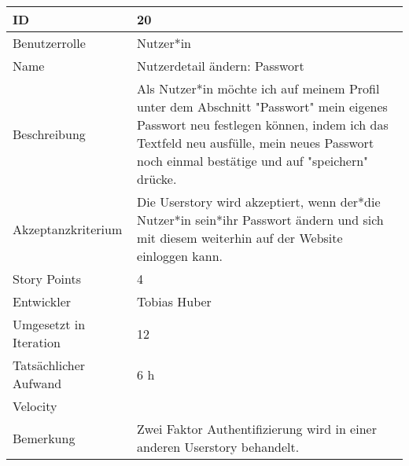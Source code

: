 \begin{tabularx}{\textwidth}{|p{}|X|}
	\hline
	ID & 20\\
	\hline
	Benutzerrolle & Nutzer*in\\
	\hline
	Name & Nutzerdetail ändern: Passwort\\
	\hline
	Beschreibung & Als Nutzer*in möchte ich auf meinem Profil unter dem Abschnitt "Passwort" mein eigenes Passwort neu festlegen können, indem ich das Textfeld neu ausfülle, mein neues Passwort noch einmal bestätige und auf "speichern" drücke.\\
	\hline
	Akzeptanzkriterium & Die Userstory wird akzeptiert, wenn der*die Nutzer*in sein*ihr Passwort ändern und sich mit diesem weiterhin auf der Website einloggen kann.\\
	\hline
	Story Points & 4\\
	\hline
	Entwickler & Tobias Huber\\
	\hline
	Umgesetzt in Iteration & 12\\ 
	\hline
	Tatsächlicher Aufwand & 6 h\\
	\hline
	Velocity & \\
	\hline
	Bemerkung & Zwei Faktor Authentifizierung wird in einer anderen Userstory behandelt.\\
	\hline
\end{tabularx}
\vspace{20pt}
